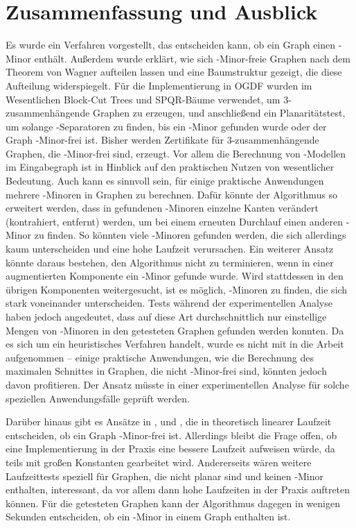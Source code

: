 \chapter{Zusammenfassung und Ausblick}
\label{cha:fazit}

Es wurde ein Verfahren vorgestellt, das entscheiden kann, ob ein Graph einen \kf-Minor enthält.
Außerdem wurde erklärt, wie sich \kf-Minor-freie Graphen nach dem Theorem von Wagner aufteilen lassen und eine Baumstruktur gezeigt, die diese Aufteilung widerspiegelt.
Für die Implementierung in OGDF wurden im Wesentlichen Block-Cut Trees und SPQR-Bäume verwendet, um $3$-zusammenhängende Graphen zu erzeugen, und anschließend ein Planaritätstest, um solange \dd-Separatoren zu finden, bis ein \kf-Minor gefunden wurde oder der Graph \kf-Minor-frei ist.
Bisher werden Zertifikate für $3$-zusammenhängende Graphen, die \kf-Minor-frei sind, erzeugt.
Vor allem die Berechnung von \kf-Modellen im Eingabegraph ist in Hinblick auf den praktischen Nutzen von wesentlicher Bedeutung.
Auch kann es sinnvoll sein, für einige praktische Anwendungen mehrere \kf-Minoren in Graphen zu berechnen.
Dafür könnte der Algorithmus \zB so erweitert werden, dass in gefundenen \kf-Minoren einzelne Kanten verändert (kontrahiert, entfernt) werden, um bei einem erneuten Durchlauf einen anderen \kf-Minor zu finden.
So könnten viele \kf-Minoren gefunden werden, die sich allerdings kaum unterscheiden und eine hohe Laufzeit verursachen.
Ein weiterer Ansatz könnte daraus bestehen, den Algorithmus nicht zu terminieren, wenn in einer augmentierten Komponente ein \kf-Minor gefunde wurde.
Wird stattdessen in den übrigen Komponenten weitergesucht, ist es möglich, \kf-Minoren zu finden, die sich stark voneinander unterscheiden.
Tests während der experimentellen Analyse haben jedoch angedeutet, dass auf diese Art durchschnittlich nur einstellige Mengen von \kf-Minoren in den getesteten Graphen gefunden werden konnten.
Da es sich um ein heuristisches Verfahren handelt, wurde es nicht mit in die Arbeit aufgenommen -- einige praktische Anwendungen, wie die Berechnung des maximalen Schnittes in Graphen, die nicht \kf-Minor-frei sind, könnten jedoch davon profitieren.
Der Ansatz müsste in einer experimentellen Analyse für solche speziellen Anwendungsfälle geprüft werden.

Darüber hinaus gibt es Ansätze in \cite{ReL08}, \cite{ReL} und \cite{Li11}, die in theoretisch linearer Laufzeit entscheiden, ob ein Graph \kf-Minor-frei ist.
Allerdings bleibt die Frage offen, ob eine Implementierung in der Praxis eine bessere Laufzeit aufweisen würde, da teils mit großen Konstanten gearbeitet wird.
Andererseits wären weitere Laufzeittests speziell für Graphen, die nicht planar sind und keinen \kf-Minor enthalten, interessant, da vor allem dann hohe Laufzeiten in der Praxis auftreten können.
Für die getesteten Graphen kann der Algorithmus dagegen in wenigen Sekunden entscheiden, ob ein \kf-Minor in einem Graph enthalten ist.
